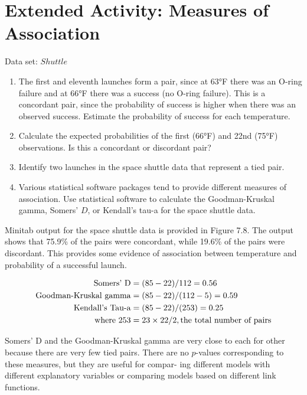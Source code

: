 \documentclass[
]{report}
\providecommand{\tightlist}{%
  \setlength{\itemsep}{0pt}\setlength{\parskip}{0pt}}
\begin{document}
\hypertarget{extended-activity-measures-of-association-1}{%
\section*{Extended Activity: Measures of Association}\label{extended-activity-measures-of-association-1}}

Data set: \(Shuttle\)

\begin{enumerate}
\def\labelenumi{\arabic{enumi}.}
\setcounter{enumi}{18}
\tightlist
\item
  The first and eleventh launches form a pair, since at 63°F there was an O-ring failure and at 66°F there was a success (no O-ring failure). This is a concordant pair, since the probability of success is higher when there was an observed success. Estimate the probability of success for each temperature.
\item
  Calculate the expected probabilities of the first (66°F) and 22nd (75°F) observations. Is this a concordant or discordant pair?
\item
  Identify two launches in the space shuttle data that represent a tied pair.
\item
  Various statistical software packages tend to provide different measures of association. Use statistical software to calculate the Goodman-Kruskal gamma, Somers' \(D\), or Kendall's tau-a for the space shuttle data.
\end{enumerate}

Minitab output for the space shuttle data is provided in Figure 7.8. The output shows that 75.9\% of the pairs
were concordant, while 19.6\% of the pairs were discordant. This provides some evidence of association
between temperature and probability of a successful launch.

\begin{align}
\text{Somers’ D} &= (85 - 22)/112 = 0.56 \notag \\
\text{Goodman-Kruskal gamma} &= (85 - 22)/(112 - 5) = 0.59 \notag \\
\text{Kendall’s Tau-a} &= (85 - 22)/(253) = 0.25 \notag \\
\text{where } 253 &= 23 \times 22/2, \text{the total number of pairs} \notag
\end{align}

Somers' D and the Goodman-Kruskal gamma are very close to each for other because there are very
few tied pairs. There are no \(p\)-values corresponding to these measures, but they are useful for compar-
ing different models with different explanatory variables or comparing models based on different link
functions.
\end{document}
